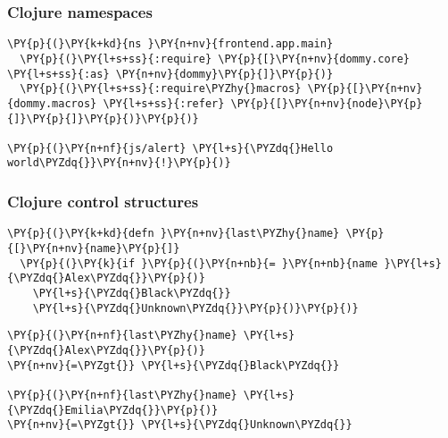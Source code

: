 \begin{frame}[fragile]
  \frametitle{Clojure namespaces}

\begin{Verbatim}[commandchars=\\\{\}]
\PY{p}{(}\PY{k+kd}{ns }\PY{n+nv}{frontend.app.main}
  \PY{p}{(}\PY{l+s+ss}{:require} \PY{p}{[}\PY{n+nv}{dommy.core} \PY{l+s+ss}{:as} \PY{n+nv}{dommy}\PY{p}{]}\PY{p}{)}
  \PY{p}{(}\PY{l+s+ss}{:require\PYZhy{}macros} \PY{p}{[}\PY{n+nv}{dommy.macros} \PY{l+s+ss}{:refer} \PY{p}{[}\PY{n+nv}{node}\PY{p}{]}\PY{p}{]}\PY{p}{)}\PY{p}{)}

\PY{p}{(}\PY{n+nf}{js/alert} \PY{l+s}{\PYZdq{}Hello world\PYZdq{}}\PY{n+nv}{!}\PY{p}{)}
\end{Verbatim}
\end{frame}


\begin{frame}[fragile]
  \frametitle{Clojure control structures}

\begin{Verbatim}[commandchars=\\\{\}]
\PY{p}{(}\PY{k+kd}{defn }\PY{n+nv}{last\PYZhy{}name} \PY{p}{[}\PY{n+nv}{name}\PY{p}{]}
  \PY{p}{(}\PY{k}{if }\PY{p}{(}\PY{n+nb}{= }\PY{n+nb}{name }\PY{l+s}{\PYZdq{}Alex\PYZdq{}}\PY{p}{)}
    \PY{l+s}{\PYZdq{}Black\PYZdq{}}
    \PY{l+s}{\PYZdq{}Unknown\PYZdq{}}\PY{p}{)}\PY{p}{)}
\end{Verbatim}

  \pause

\begin{Verbatim}[commandchars=\\\{\}]
\PY{p}{(}\PY{n+nf}{last\PYZhy{}name} \PY{l+s}{\PYZdq{}Alex\PYZdq{}}\PY{p}{)}
\PY{n+nv}{=\PYZgt{}} \PY{l+s}{\PYZdq{}Black\PYZdq{}}

\PY{p}{(}\PY{n+nf}{last\PYZhy{}name} \PY{l+s}{\PYZdq{}Emilia\PYZdq{}}\PY{p}{)}
\PY{n+nv}{=\PYZgt{}} \PY{l+s}{\PYZdq{}Unknown\PYZdq{}}
\end{Verbatim}
\end{frame}


